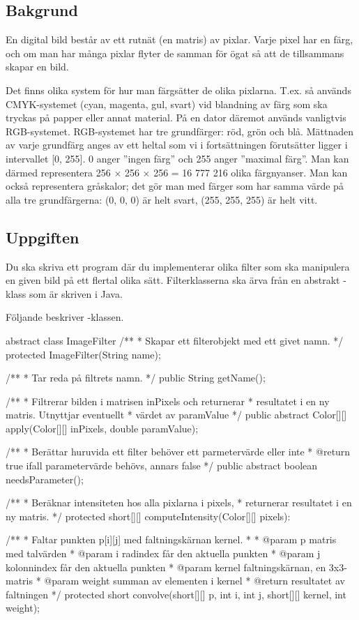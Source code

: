 

\subsection{Bakgrund}

En digital bild består av ett rutnät (en matris) av pixlar. Varje pixel har en färg, och om man har många pixlar flyter de samman för ögat så att de tillsammans skapar en bild.

Det finns olika system för hur man färgsätter de olika pixlarna. T.ex. så används CMYK-systemet (cyan, magenta, gul, svart) vid blandning av färg som ska tryckas på papper eller annat material. På en dator däremot används vanligtvis RGB-systemet. RGB-systemet har tre grundfärger: röd, grön och blå. Mättnaden av varje grundfärg anges av ett heltal som vi i fortsättningen förutsätter ligger i intervallet [0, 255]. 0 anger ”ingen färg” och 255 anger ”maximal färg”. Man kan därmed representera 256 × 256 × 256 = 16 777 216 olika färgnyanser. Man kan också representera gråskalor; det gör man med färger som har samma värde på alla tre grundfärgerna: (0, 0, 0) är helt svart, (255, 255, 255) är helt vitt.


\subsection{Uppgiften}
Du ska skriva ett program där du implementerar olika filter som ska manipulera en given bild på ett flertal olika sätt. Filterklasserna ska ärva från en abstrakt -klass som är skriven i Java.

Följande beskriver -klassen.

\begin{JavaSpec}{abstract class ImageFilter}
/**
 * Skapar ett filterobjekt med ett givet namn.
 */
protected ImageFilter(String name);

/**
 * Tar reda på filtrets namn.
 */
public String getName();

/**
 * Filtrerar bilden i matrisen inPixels och returnerar
 * resultatet i en ny matris. Utnyttjar eventuellt 
 * värdet av paramValue
 */
public abstract Color[][] apply(Color[][] inPixels,
				 double paramValue);

/**
 * Berättar huruvida ett filter behöver ett parmetervärde eller inte
 * @return true ifall parametervärde behövs, annars false
 */
public abstract boolean needsParameter();

/**
 * Beräknar intensiteten hos alla pixlarna i pixels,
 * returnerar resultatet i en ny matris.
 */
protected short[][] computeIntensity(Color[][] pixels):

/**
 * Faltar punkten p[i][j] med faltningskärnan kernel.
 * 
 * @param p 		matris med talvärden
 * @param i 		radindex får den aktuella punkten
 * @param j 		kolonnindex får den aktuella punkten
 * @param kernel	faltningskärnan, en 3x3-matris
 * @param weight	summan av elementen i kernel
 * @return 		resultatet av faltningen
 */
protected short convolve(short[][] p, int i, int j, 
			short[][] kernel, int weight);
\end{JavaSpec}

